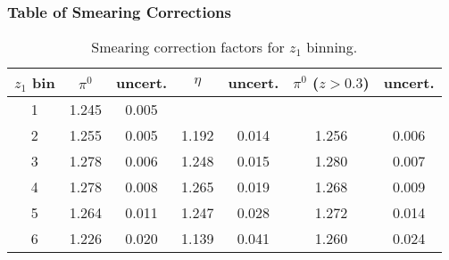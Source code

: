 \subsubsection{Table of Smearing Corrections}
\label{sec:appendixC}
\begin{table}[H]\footnotesize
\centering
\begin{tabular}{|c||c|c||c|c||c|c|}
\hline
$z_1$ bin & $\pi^0$ &  uncert. & $\eta$  & uncert. & $\pi^0$ ($z>0.3$) & uncert. \\ \hline \hline 
1	&	1.245	&	0.005	&			&			&			&			\\ \hline
2	&	1.255	&	0.005	&	1.192	&	0.014	&	1.256	&	0.006	\\ \hline
3	&	1.278	&	0.006	&	1.248	&	0.015	&	1.280	&	0.007	\\ \hline
4	&	1.278	&	0.008	&	1.265	&	0.019	&	1.268	&	0.009	\\ \hline
5	&	1.264	&	0.011	&	1.247	&	0.028	&	1.272	&	0.014	\\ \hline
6	&	1.226	&	0.020	&	1.139	&	0.041	&	1.260	&	0.024	\\ \hline
\end{tabular}
\caption{Smearing correction factors for $z_1$ binning.}
\label{tab:sinz_smearing_info}
\end{table}

